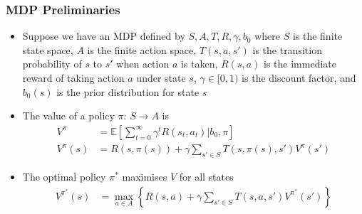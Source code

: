 \documentclass{beamer}
\begin{document}
\begin{frame}
\frametitle{MDP Preliminaries}
    \begin{itemize}
        \item Suppose we have an MDP defined by $S, A, T, R, \gamma, b_0$ where $S$ is the finite state space, $A$ is the finite action space, $T(s, a, s')$ is the transition probability of $s$ to $s'$ when action $a$ is taken, $R(s,a)$ is the immediate reward of taking action $a$ under state $s$, $\gamma \in [0,1)$ is the discount factor, and $b_0(s)$ is the prior distribution for state $s$
        \item The value of a policy $\pi$: $S \rightarrow A$ is
        \begin{align*}
        V^{\pi} &= \mathbb{E}\left[\sum_{t = 0}^{\infty} \gamma^{t} R(s_t, a_t) | b_0, \pi \right] \\
        V^{\pi}(s) &= R(s, \pi(s)) + \gamma \sum_{s' \in S} T(s, \pi(s), s') V^{\pi}(s')
        \end{align*}
        \item The optimal policy $\pi^{\ast}$ maximises $V$ for all states
        \begin{align*}
        V^{\pi^{\ast}}(s) &= \max_{a \in A} \left\{ R(s,a) + \gamma \sum_{s' \in S} T(s,a,s') V^{\pi^{\ast}}(s') \right\}
        \end{align*}
    \end{itemize}
\end{frame}
\end{document}
